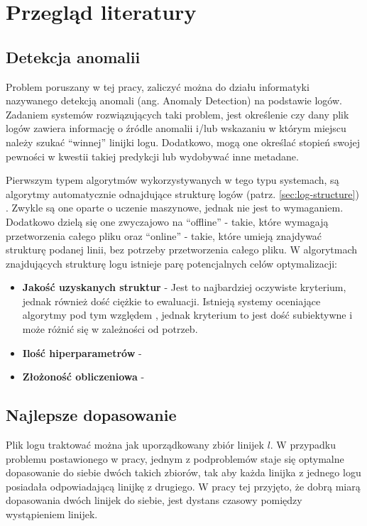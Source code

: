 \chapter{Przegląd literatury}

\section{Detekcja anomalii}

Problem poruszany w tej pracy, zaliczyć można do działu informatyki nazywanego
detekcją anomali (ang. Anomaly Detection) na podstawie logów.
Zadaniem systemów rozwiązujących taki problem, jest określenie czy dany plik
logów zawiera informację o źródle anomalii i/lub wskazaniu w którym miejscu
należy szukać ``winnej'' linijki logu.
Dodatkowo, mogą one określać stopień swojej pewności w kwestii takiej predykcji
lub wydobywać inne metadane.

Pierwszym typem algorytmów wykorzystywanych w tego typu systemach, są algorytmy
automatycznie odnajdujące strukturę logów (patrz. \ref{sec:log-structure})
\cite{Logparser}\cite{DSN16}.
Zwykle są one oparte o uczenie maszynowe, jednak nie jest to wymaganiem.
Dodatkowo dzielą się one zwyczajowo na ``offline'' - takie, które wymagają
przetworzenia całego pliku oraz ``online'' - takie, które umieją znajdywać
strukturę podanej linii, bez potrzeby przetworzenia całego pliku.
W algorytmach znajdujących strukturę logu istnieje parę potencjalnych celów optymalizacji:

\begin{itemize}
  \item \textbf{Jakość uzyskanych struktur} - Jest to najbardziej oczywiste
    kryterium, jednak również dość ciężkie to ewaluacji. Istnieją systemy
    oceniające algorytmy pod tym względem \cite{Logparser}, jednak kryterium to
    jest dość subiektywne i może różnić się w zależności od potrzeb.
  \item \textbf{Ilość hiperparametrów} - \todo{}
  \item \textbf{Złożoność obliczeniowa} - \todo{}
\end{itemize}

\section{Najlepsze dopasowanie}

Plik logu traktować można jak uporządkowany zbiór linijek $l$.
W przypadku problemu postawionego w pracy, jednym z podproblemów staje się
optymalne dopasowanie do siebie dwóch takich zbiorów, tak aby każda linijka z
jednego logu posiadała odpowiadającą linijkę z drugiego.
W pracy tej przyjęto, że dobrą miarą dopasowania dwóch linijek do siebie, jest
dystans czasowy pomiędzy wystąpieniem linijek.

